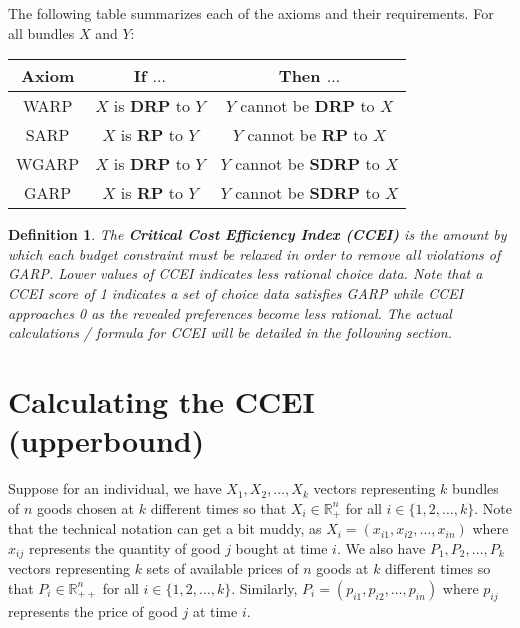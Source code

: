 \documentclass{article} %
\newtheorem{definition}{Definition} %
\begin{document}
The following table summarizes each of the axioms and their requirements. For all bundles $X$ and $Y$:

\renewcommand{\arraystretch}{1.5}
\begin{center}
\begin{tabular}{ c|c|c } 
Axiom & If $\ldots$ & Then $\ldots$ \\\hline
WARP&$X$ is \textbf{DRP} to $Y$&$Y$ cannot be \textbf{DRP} to $X$ \\
SARP&$X$ is \textbf{RP} to $Y$&$Y$ cannot be \textbf{RP} to $X$ \\
WGARP&$X$ is \textbf{DRP} to $Y$&$Y$ cannot be \textbf{SDRP} to $X$ \\
GARP&$X$ is \textbf{RP} to $Y$&$Y$ cannot be \textbf{SDRP} to $X$
\end{tabular}
\end{center}
\renewcommand{\arraystretch}{1}

\begin{definition}
The \textbf{Critical Cost Efficiency Index (CCEI)} is the amount by which each budget
constraint must be relaxed in order to remove all violations of GARP. Lower values of CCEI indicates less rational choice data. Note that a CCEI score of 1 indicates a set of choice data satisfies GARP while CCEI approaches 0 as the revealed preferences become less rational. The actual calculations / formula for CCEI will be detailed in the following section.
\end{definition}

\section{Calculating the CCEI (upperbound)}
Suppose for an individual, we have $X_{1}, X_{2}, \ldots, X_{k}$ vectors representing $k$ bundles of $n$ goods chosen at $k$ different times so that $X_{i}\in\mathbb{R}^{n}_{+}$ for all $i\in\{1,2,\ldots,k\}$. Note that the technical notation can get a bit muddy, as $X_{i}=(x_{i1}, x_{i2}, \ldots, x_{in})$ where $x_{ij}$ represents the quantity of good $j$ bought at time $i$. We also have $P_{1}, P_{2}, \dots, P_{k}$ vectors representing $k$ sets of available prices of $n$ goods at $k$ different times so that $P_{i}\in\mathbb{R}^{n}_{++}$ for all $i\in\{1,2,\ldots,k\}$. Similarly, $P_{i}=(p_{i1}, p_{i2}, \ldots, p_{in})$ where $p_{ij}$ represents the price of good $j$ at time $i$.
\end{document}

